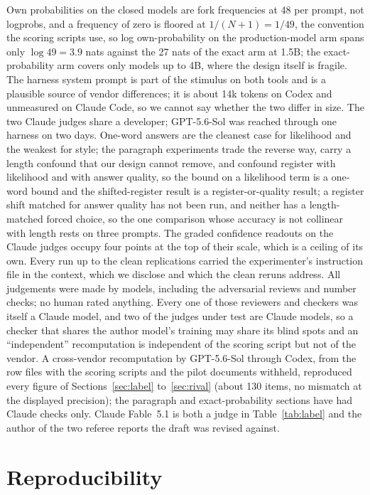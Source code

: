 \documentclass[twocolumn,10pt]{article}
\newcommand{\gpt}{GPT-5.6-Sol}
\begin{document}
Own probabilities on the closed models are fork frequencies at 48 per prompt, not logprobs, and a frequency of zero is floored at $1/(N+1) = 1/49$, the convention the scoring scripts use, so log own-probability on the production-model arm spans only $\log 49 = 3.9$ nats against the 27 nats of the exact arm at 1.5B; the exact-probability arm covers only models up to 4B, where the design itself is fragile. The harness system prompt is part of the stimulus on both tools and is a plausible source of vendor differences; it is about 14k tokens on Codex and unmeasured on Claude Code, so we cannot say whether the two differ in size. The two Claude judges share a developer; \gpt{} was reached through one harness on two days. One-word answers are the cleanest case for likelihood and the weakest for style; the paragraph experiments trade the reverse way, carry a length confound that our design cannot remove, and confound register with likelihood and with answer quality, so the bound on a likelihood term is a one-word bound and the shifted-register result is a register-or-quality result; a register shift matched for answer quality has not been run, and neither has a length-matched forced choice, so the one comparison whose accuracy is not collinear with length rests on three prompts. The graded confidence readouts on the Claude judges occupy four points at the top of their scale, which is a ceiling of its own. Every run up to the clean replications carried the experimenter's instruction file in the context, which we disclose and which the clean reruns address. All judgements were made by models, including the adversarial reviews and number checks; no human rated anything. Every one of those reviewers and checkers was itself a Claude model, and two of the judges under test are Claude models, so a checker that shares the author model's training may share its blind spots and an ``independent'' recomputation is independent of the scoring script but not of the vendor. A cross-vendor recomputation by \gpt{} through Codex, from the row files with the scoring scripts and the pilot documents withheld, reproduced every figure of Sections~\ref{sec:label} to~\ref{sec:rival} (about 130 items, no mismatch at the displayed precision); the paragraph and exact-probability sections have had Claude checks only. Claude Fable~5.1 is both a judge in Table~\ref{tab:label} and the author of the two referee reports the draft was revised against.

\section{Reproducibility}
\end{document}
